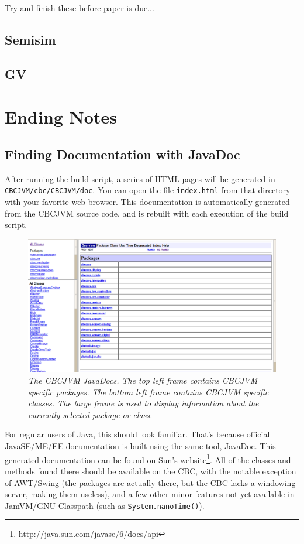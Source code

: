 \documentclass[12pt,letterpaper]{article}
\newcommand{\urlfootnote}[1]{\footnote{\url{#1}}}
\begin{document}
Try and finish these before paper is due...
\subsection{Semisim}

\subsection{GV}

\pagebreak
\section{Ending Notes}

\subsection{Finding Documentation with JavaDoc}

After running the build script, a series of HTML pages will be generated in \texttt{CBCJVM/\-cbc/\-CBCJVM/\-doc}. You can open the file \texttt{index.html} from that directory with your favorite web-browser. This documentation is automatically generated from the CBCJVM source code, and is rebuilt with each execution of the build script.

\begin{figure}[h]
\includegraphics[width=\textwidth]{javadocs.png}
\caption{\textit{The CBCJVM JavaDocs. The top left frame contains CBCJVM specific packages. The bottom left frame contains CBCJVM specific classes. The large frame is used to display information about the currently selected package or class.}}
\end{figure}

For regular users of Java, this should look familiar. That's because official JavaSE/\-ME/\-EE documentation is built using the same tool, JavaDoc. This generated documentation can be found on Sun's website\urlfootnote{http://java.sun.com/javase/6/docs/api}. All of the classes and methods found there should be available on the CBC, with the notable exception of AWT/\-Swing (the packages are actually there, but the CBC lacks a windowing server, making them useless), and a few other minor features not yet available in JamVM/\-GNU-Classpath (such as \texttt{System.\-nanoTime()}).
\end{document}

